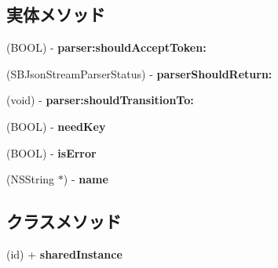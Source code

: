 \subsection*{実体メソッド}
\begin{DoxyCompactItemize}
\item 
\hypertarget{interface_s_b_json_stream_parser_state_a4c82e9be435d6f393bf5a0467c1e83eb}{}(B\+O\+O\+L) -\/ {\bfseries parser\+:should\+Accept\+Token\+:}\label{interface_s_b_json_stream_parser_state_a4c82e9be435d6f393bf5a0467c1e83eb}

\item 
\hypertarget{interface_s_b_json_stream_parser_state_a7ba884f572ebae244fd252055aed25fc}{}(S\+B\+Json\+Stream\+Parser\+Status) -\/ {\bfseries parser\+Should\+Return\+:}\label{interface_s_b_json_stream_parser_state_a7ba884f572ebae244fd252055aed25fc}

\item 
\hypertarget{interface_s_b_json_stream_parser_state_a5ed454a903b6bd268f1c1b373e243013}{}(void) -\/ {\bfseries parser\+:should\+Transition\+To\+:}\label{interface_s_b_json_stream_parser_state_a5ed454a903b6bd268f1c1b373e243013}

\item 
\hypertarget{interface_s_b_json_stream_parser_state_aab97dd88c338d285cc9aca7f21875ae1}{}(B\+O\+O\+L) -\/ {\bfseries need\+Key}\label{interface_s_b_json_stream_parser_state_aab97dd88c338d285cc9aca7f21875ae1}

\item 
\hypertarget{interface_s_b_json_stream_parser_state_a8d04c21bcd093e5817bdbff30f39ba46}{}(B\+O\+O\+L) -\/ {\bfseries is\+Error}\label{interface_s_b_json_stream_parser_state_a8d04c21bcd093e5817bdbff30f39ba46}

\item 
\hypertarget{interface_s_b_json_stream_parser_state_ae150e3c382beb444010927434679cf77}{}(N\+S\+String $\ast$) -\/ {\bfseries name}\label{interface_s_b_json_stream_parser_state_ae150e3c382beb444010927434679cf77}

\end{DoxyCompactItemize}
\subsection*{クラスメソッド}
\begin{DoxyCompactItemize}
\item 
\hypertarget{interface_s_b_json_stream_parser_state_ad17b227a54da2a32a63e5d1f586f0109}{}(id) + {\bfseries shared\+Instance}\label{interface_s_b_json_stream_parser_state_ad17b227a54da2a32a63e5d1f586f0109}

\end{DoxyCompactItemize}


